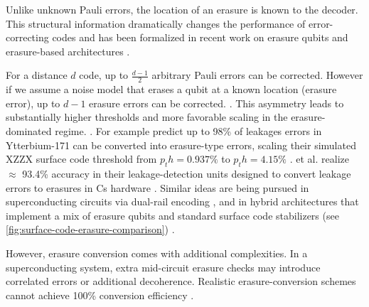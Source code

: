 \documentclass[11pt, notitlepage, letterpaper]{article}
\begin{document}
Unlike unknown Pauli errors, the location of an erasure is known to the decoder. This structural information dramatically changes the performance of error-correcting codes and has been formalized in recent work on erasure qubits and erasure-based architectures \cite{kubica_erasure_2023} \cite{gu_fault-tolerant_2025}\cite{gu_optimizing_2024}.

For a distance $d$ code, up to $\frac{d-1}{2}$ arbitrary Pauli errors can be corrected. However if we assume a noise model that erases a qubit at a known location (erasure error), up to $d-1$ erasure errors can be corrected. \cite{kubica_erasure_2023}\cite{gu_fault-tolerant_2025}. This asymmetry leads to substantially higher thresholds and more favorable scaling in the erasure-dominated regime. \cite{wu_erasure_2022}\cite{sahay_high-threshold_2023}\cite{gu_optimizing_2024}.
For example \citeauthor{wu_erasure_2022} predict up to 98\% of leakages errors in Ytterbium-171 can be converted into erasure-type errors, scaling their simulated XZZX surface code threshold from $p_th = 0.937\%$ to $p_th = 4.15\%$ \cite{wu_erasure_2022}. \citeauthor{chow_circuit-based_2024} et al. realize $\approx$ 93.4\% accuracy in their leakage-detection units designed to convert leakage errors to erasures in Cs hardware \cite{chow_circuit-based_2024}. Similar ideas are being pursued in superconducting circuits via dual-rail encoding \cite{kubica_erasure_2023}\cite{gu_fault-tolerant_2025}\cite{gu_optimizing_2024}, and in hybrid architectures that implement a mix of erasure qubits and standard surface code stabilizers (see \autoref{fig:surface-code-erasure-comparison})\cite{chadwick_erasure_2025} \cite{baranes_leveraging_2025}.

However, erasure conversion comes with additional complexities. In a superconducting system, extra mid-circuit erasure checks may introduce correlated errors or additional decoherence. Realistic erasure-conversion schemes cannot achieve 100\% conversion efficiency \cite{ma_high-fidelity_2023}\cite{wu_erasure_2022}\cite{gu_optimizing_2024}.

\end{document}
